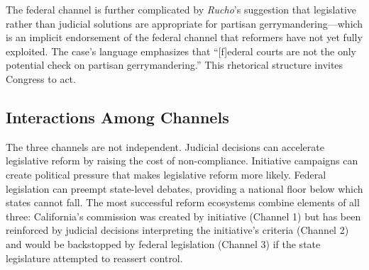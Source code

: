 The federal channel is further complicated by \textit{Rucho}'s suggestion that legislative rather than judicial solutions are appropriate for partisan gerrymandering---which is an implicit endorsement of the federal channel that reformers have not yet fully exploited. The case's language emphasizes that ``[f]ederal courts are not the only potential check on partisan gerrymandering.'' This rhetorical structure invites Congress to act.

\subsection{Interactions Among Channels}

The three channels are not independent. Judicial decisions can accelerate legislative reform by raising the cost of non-compliance. Initiative campaigns can create political pressure that makes legislative reform more likely. Federal legislation can preempt state-level debates, providing a national floor below which states cannot fall. The most successful reform ecosystems combine elements of all three: California's commission was created by initiative (Channel 1) but has been reinforced by judicial decisions interpreting the initiative's criteria (Channel 2) and would be backstopped by federal legislation (Channel 3) if the state legislature attempted to reassert control.
